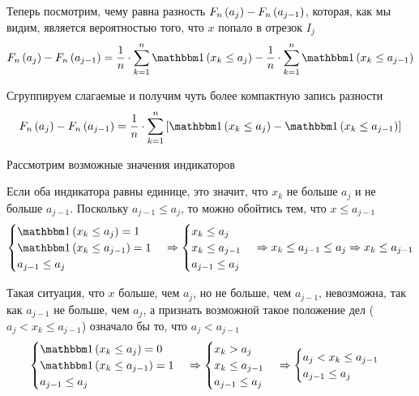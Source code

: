 Теперь посмотрим, чему равна разность $F_n\left(a_j\right)-F_n\left(a_{j-1}\right)$,
которая, как мы видим, является вероятностью того,
что $x$ попало в отрезок $I_j$
$$\cdfn{a_j}-\cdfn{a_{j-1}}
    =\frac{1}{n}\cdot \sum_{k=1}^n
    \indicator{x_k\le a_j}-\frac{1}{n}\cdot \sum_{k=1}^n
    \indicator{x_k\le a_{j-1}}$$

Сгруппируем слагаемые и получим чуть более компактную запись разности
\begin{equation}\label{eq:cdfn_difference}
    \cdfn{a_j}-\cdfn{a_{j-1}}=\frac{1}{n}\cdot \sum_{k=1}^n
    \left[\indicator{x_k\le a_j}-\indicator{x_k\le a_{j-1}}\right]
\end{equation}

Рассмотрим возможные значения индикаторов

Если оба индикатора равны единице,
это значит, что $x_k$ не больше $a_j$ и не больше $a_{j-1}$.
Поскольку $a_{j-1}\le a_j$, то можно обойтись тем, что $x\le a_{j-1}$
\begin{align*}
    \begin{cases}
        \indicator{x_k\le a_j}=1\\
        \indicator{x_k\le a_{j-1}}=1\\
        a_{j-1}\le a_j
    \end{cases}
    \Rightarrow
    \begin{cases}
        x_k\le a_j\\
        x_k\le a_{j-1}\\
        a_{j-1}\le a_j
    \end{cases}
    \Rightarrow
        x_k\le a_{j-1}\le a_j
    \Rightarrow
        x_k\le a_{j-1}
\end{align*}

Такая ситуация,
что $x$ больше, чем $a_j$, но не больше, чем $a_{j-1}$, невозможна,
так как $a_{j-1}$ не больше, чем $a_j$,
а признать возможной такое положение дел ($a_j<x_k\le a_{j-1}$)
означало бы то, что $a_j<a_{j-1}$
\begin{align*}
    \begin{cases}
        \indicator{x_k\le a_j}=0\\
        \indicator{x_k\le a_{j-1}}=1\\
        a_{j-1}\le a_j
    \end{cases}
    \Rightarrow
    \begin{cases}
        x_k>a_j\\
        x_k\le a_{j-1}\\
        a_{j-1}\le a_j
    \end{cases}
    \Rightarrow
    \begin{cases}
        a_j<x_k\le a_{j-1}\\
        a_{j-1}\le a_j
    \end{cases}
\end{align*}


